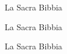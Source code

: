 \begin{thebibliography}{90}            
La Sacra Bibbia

La Sacra Bibbia

La Sacra Bibbia
\end{thebibliography}
